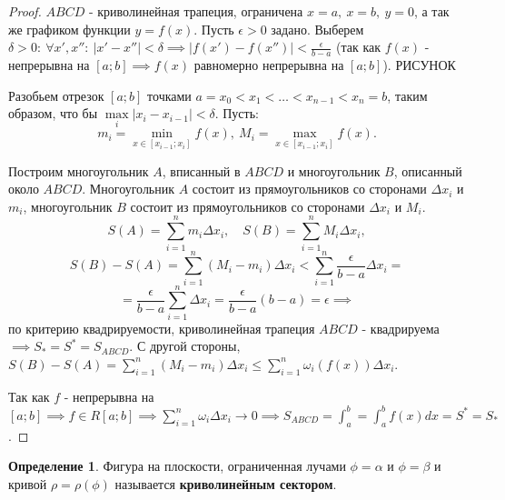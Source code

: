 \documentclass{report}
\theoremstyle{definition}
\newtheorem{definition}{Определение}[section]
\begin{document}
\begin{proof}
  $ABCD$ - криволинейная трапеция, ограничена $x=a, \ x=b, \ y=0$, а так же графиком функции $y = f(x)$.
  Пусть $\epsilon > 0$ задано. Выберем $\delta>0: \ \forall x',x'':  \ | x' - x'' | < \delta \implies
    | f(x') - f(x'') | < \frac{\epsilon}{b - a}$ (так как $f(x)$ - непрерывна на $[a;b] \implies f(x)$
  равномерно непрерывна на $[a;b]$). {\Large РИСУНОК}

  Разобьем отрезок $[a;b]$ точками $a=x_0 < x_1 <\ldots < x_{n-1} < x_n = b$, таким образом, что бы
  $\underset{i}{\max}| x_i - x_{i-1} | < \delta$. Пусть:
  \begin{equation*}
    m_i = \underset{x\in[x_{i-1};x_i]}{\min}f(x), \ M_i = \underset{x\in[x_{i-1};x_i]}{\max}f(x).
  \end{equation*}

  Построим многоугольник $A$, вписанный в $ABCD$ и многоугольник $B$, описанный около $ABCD$. Многоугольник
  $A$ состоит из прямоугольников со сторонами $\Delta x_i$ и $m_i$, многоугольник $B$ состоит из прямоугольников
  со сторонами $\Delta x_i$ и $M_i$.
  \begin{equation*}
    S(A) = \sum_{i=1}^{n}m_i\Delta x_i, \quad S(B) = \sum_{i=1}^{n}M_i\Delta x_i,
  \end{equation*}
  \begin{equation*}
    S(B) - S(A) = \sum_{i=1}^{n}(M_i - m_i)\Delta x_i < \sum_{i=1}^{n}\frac{\epsilon}{b-a}\Delta x_i =
  \end{equation*}
  \begin{equation*}
    = \frac{\epsilon}{b-a}\sum_{i=1}^{n}\Delta x_i = \frac{\epsilon}{b-a}(b-a) = \epsilon \implies
  \end{equation*}
  по критерию квадрируемости, криволинейная трапеция $ABCD$ - квадрируема $\implies S_* = S^* = S_{ABCD}$.
  С другой стороны, $S(B) - S(A) = \sum_{i=1}^{n}(M_i - m_i)\Delta x_i \leqslant \sum_{i=1}^{n}\omega_i
    (f(x))\Delta x_i$.

  Так как $f$ - непрерывна на $[a;b] \implies f\in R[a;b] \implies \sum_{i=1}^{n}\omega_i\Delta x_i
    \rightarrow 0 \implies S_{ABCD} = \int_{a}^{b} = \int_{a}^{b}f(x)dx = S^* = S_*$.
\end{proof}

\begin{definition}
  Фигура на плоскости, ограниченная лучами $\phi = \alpha$ и $\phi = \beta$ и кривой $\rho = \rho(\phi)$
  называется \textbf{криволинейным сектором}.
\end{definition}
\end{document}
